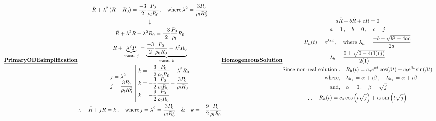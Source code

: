 \documentclass[12pt]{article}
\begin{document}
\begin{subequations}
    \label{eqn:anl_deriv}
    \noindent \underline{\bf Primary ODE simplification}
    \centering
    \begin{gather}
        \ddot R + \lambda^2 \left(R - R_0\right) = \frac{-3}{2} \frac{P_0}{\rho_l R_0}, \quad \text{where} \, \lambda^2 = \frac{3 P_0}{\rho_l R_0^2} \\
        \downarrow \notag \\
        \ddot R + \lambda^2 R - \lambda^2 R_0 = \frac{-3}{2}\frac{P_0}{\rho_l}{R_0} \notag \\
        \ddot R + \underbrace{\lambda^2 P}_{\text{const. }j} = \underbrace{\frac{-3}{2}\frac{P_0}{\rho_0 R_0} - \lambda^2 R_0}_{\text{const. }k} \notag \\
         \begin{array}{c|c}
            \begin{aligned}
                j &= \lambda^2 \notag\\
                j &= \frac{3 P_0}{\rho_l R_0^2} \notag
            \end{aligned}
            &
            \begin{aligned}
                k &= -\frac{3}{2}\frac{P_0}{\rho_0 R_0} - \lambda^2 R_0 \notag \\
                k &= -\frac{3}{2}\frac{P_0}{\rho_l R_0} - \frac{3 P_0}{\rho_l R_0} \notag \\
                k &= -\frac{9}{2}\frac{P_0}{\rho_l R_0} \notag
            \end{aligned}
         \end{array} \notag \\
        \therefore \quad \ddot R + jR = k \, , \quad \text{where} \, j = \lambda^2 = \frac{3 P_0}{\rho_l R_0^2} \quad \& \quad k = -\frac{9}{2}\frac{P_0}{\rho_l R_0}
    \end{gather}
    
    \underline{\bf Homogeneous Solution}
    \begin{gather}
        a \ddot R + b \dot R + c R = 0 \notag \\
        a=1 \, , \quad b = 0 \, , \quad c=j \notag \\
        R_h(t) = e^{\lambda_h t} \, , \quad \text{where } \lambda_h = \frac{-b  	\pm \sqrt{b^2 - 4ac}}{2a} \notag \\
        \lambda_h = \frac{0 \pm \sqrt{0 - 4(1)(j)}}{2(1)} \notag \\
        \begin{aligned}
            \text{Since non-real solution}: & \quad R_h(t) = c_a e^{\alpha t} \cos(\beta t) + c_b e^{\beta t}\sin(\beta t) \notag \\
            \text{where}, & \quad \lambda_{h_p} = \alpha + i \beta \, , \quad \lambda_{h_p} = \alpha + i \beta \notag \\
            \text{and}, & \quad \alpha = 0 \, , \quad \beta = \sqrt{j} \notag
        \end{aligned} \\
        \therefore \quad R_h(t) = c_a \cos \left(t\sqrt{j}\right) + c_b \sin \left(t\sqrt{j}\right)
    \end{gather}
    

\end{subequations}
\end{document}
